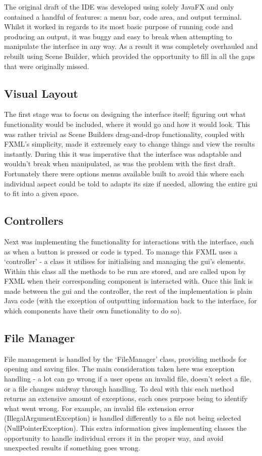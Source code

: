 \documentclass[
]{report}
\begin{document}
The original draft of the IDE was developed using solely JavaFX and only
contained a handful of features: a menu bar, code area, and output
terminal. Whilst it worked in regards to its most basic purpose of
running code and producing an output, it was buggy and easy to break
when attempting to manipulate the interface in any way. As a result it
was completely overhauled and rebuilt using Scene Builder, which
provided the opportunity to fill in all the gaps that were originally
missed.

\subsection{Visual Layout}
The first stage was to focus on designing the interface itself; figuring
out what functionality would be included, where it would go and how it
would look. This was rather trivial as Scene Builders drag-and-drop
functionality, coupled with FXML's simplicity, made it extremely easy to
change things and view the results instantly. During this it was
imperative that the interface was adaptable and wouldn't break when
manipulated, as was the problem with the first draft. Fortunately there
were options menus available built to avoid this where each individual
aspect could be told to adapts its size if needed, allowing the entire
\acrshort{gui} to fit into a given space.

\subsection{Controllers}
Next was implementing the functionality for interactions with the
interface, such as when a button is pressed or code is typed. To manage
this FXML uses a `controller' - a class it utilises for initialising and
managing the \acrshort{gui}'s elements. Within this class all the methods to be run
are stored, and are called upon by FXML when their corresponding
component is interacted with. Once this link is made between the \acrshort{gui} and
the controller, the rest of the implementation is plain Java code (with
the exception of outputting information back to the interface, for which
components have their own functionality to do so).

\subsection{File Manager}
File management is handled by the `FileManager' class, providing methods
for opening and saving files. The main consideration taken here was
exception handling - a lot can go wrong if a user opens an invalid file,
doesn't select a file, or a file changes midway through handling. To
deal with this each method returns an extensive amount of exceptions,
each ones purpose being to identify what went wrong. For example, an
invalid file extension error (IllegalArgumentException) is handled
differently to a file not being selected (NullPointerException). This
extra information gives implementing classes the opportunity to handle
individual errors it in the proper way, and avoid unexpected results if
something goes wrong.
\end{document}

